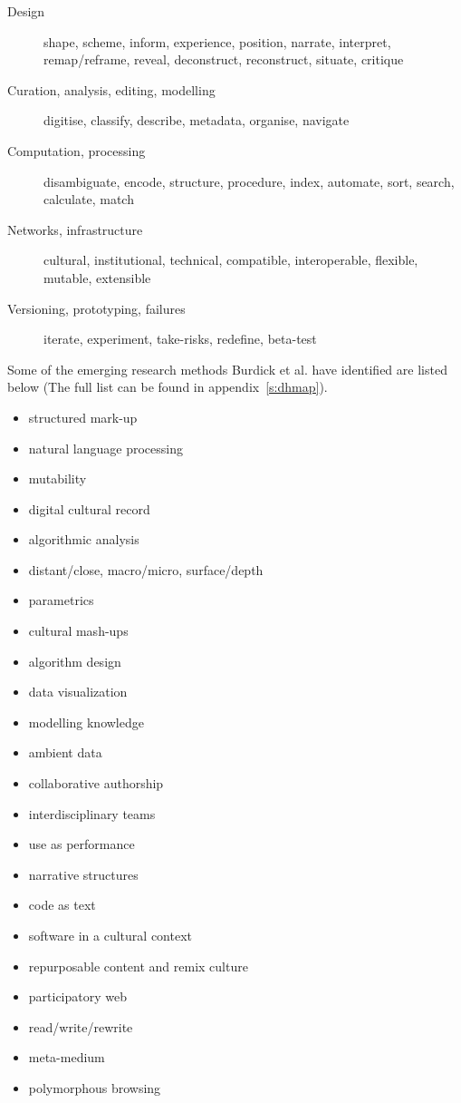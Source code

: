 \begin{description}
  \item [Design] shape, scheme, inform, experience, position, narrate,
  					interpret, remap/reframe, reveal, deconstruct, reconstruct,
  					situate, critique
  \item [Curation, analysis, editing, modelling] digitise, classify, describe, metadata, organise, navigate
  \item [Computation, processing] disambiguate, encode, structure, procedure, index, automate, sort, search, calculate, match
  \item [Networks, infrastructure] cultural, institutional, technical, compatible, interoperable, flexible, mutable, extensible
  \item [Versioning, prototyping, failures]	iterate, experiment, take-risks, redefine, beta-test
\end{description}

Some of the emerging research methods Burdick et al. have identified are listed below \autocite*{Burdick2012} (The full list can be found in appendix~\ref{s:dhmap}).

\begin{multicols}{2}\raggedright
\begin{itemize}
  \item structured mark-up
  \item	natural language processing
  \item	mutability
  \item	digital cultural record
  \item	algorithmic analysis
  \item distant/close, macro/micro, surface/depth
  \item parametrics
  \item	cultural mash-ups
  \item	algorithm design
  \item data visualization
  \item	modelling knowledge
  \item	ambient data
  \item	collaborative authorship
  \item	interdisciplinary teams
  \item	use as performance
  \item narrative structures
  \item	code as text
  \item	software in a cultural context
  \item repurposable content and remix culture
  \item participatory web
  \item	read/write/rewrite
  \item	meta-medium
  \item	polymorphous browsing
\end{itemize}
\end{multicols}

